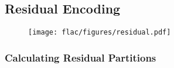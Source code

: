 
\subsection{Residual Encoding}
\label{flac:write_residual_block}
{
  
}
\begin{figure}[h]
\texttt{[image: flac/figures/residual.pdf]}
\end{figure}

\clearpage

\subsubsection{Calculating Residual Partitions}
\label{flac:calculate_residual_partitions}
{
  
}

\clearpage

